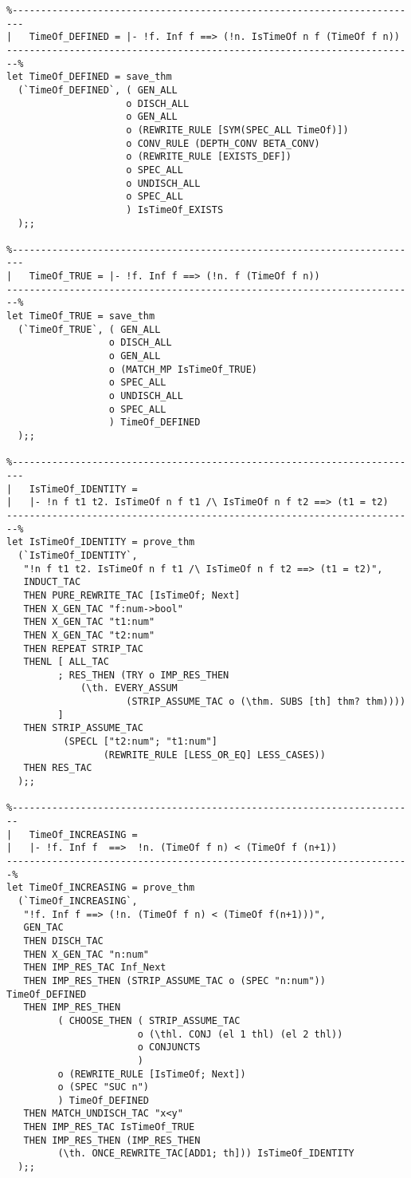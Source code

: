 \begin{verbatim}
%------------------------------------------------------------------------
|   TimeOf_DEFINED = |- !f. Inf f ==> (!n. IsTimeOf n f (TimeOf f n))
------------------------------------------------------------------------%
let TimeOf_DEFINED = save_thm
  (`TimeOf_DEFINED`, ( GEN_ALL
                     o DISCH_ALL
                     o GEN_ALL
                     o (REWRITE_RULE [SYM(SPEC_ALL TimeOf)])
                     o CONV_RULE (DEPTH_CONV BETA_CONV)
                     o (REWRITE_RULE [EXISTS_DEF])
                     o SPEC_ALL
                     o UNDISCH_ALL
                     o SPEC_ALL
                     ) IsTimeOf_EXISTS
  );;

%------------------------------------------------------------------------
|   TimeOf_TRUE = |- !f. Inf f ==> (!n. f (TimeOf f n))
------------------------------------------------------------------------%
let TimeOf_TRUE = save_thm
  (`TimeOf_TRUE`, ( GEN_ALL
                  o DISCH_ALL
                  o GEN_ALL
                  o (MATCH_MP IsTimeOf_TRUE)
                  o SPEC_ALL
                  o UNDISCH_ALL
                  o SPEC_ALL
                  ) TimeOf_DEFINED
  );;

%------------------------------------------------------------------------
|   IsTimeOf_IDENTITY =
|   |- !n f t1 t2. IsTimeOf n f t1 /\ IsTimeOf n f t2 ==> (t1 = t2)
------------------------------------------------------------------------%
let IsTimeOf_IDENTITY = prove_thm
  (`IsTimeOf_IDENTITY`,
   "!n f t1 t2. IsTimeOf n f t1 /\ IsTimeOf n f t2 ==> (t1 = t2)",
   INDUCT_TAC
   THEN PURE_REWRITE_TAC [IsTimeOf; Next]
   THEN X_GEN_TAC "f:num->bool"
   THEN X_GEN_TAC "t1:num"
   THEN X_GEN_TAC "t2:num"
   THEN REPEAT STRIP_TAC
   THENL [ ALL_TAC
         ; RES_THEN (TRY o IMP_RES_THEN
             (\th. EVERY_ASSUM
                     (STRIP_ASSUME_TAC o (\thm. SUBS [th] thm? thm))))
         ]
   THEN STRIP_ASSUME_TAC
          (SPECL ["t2:num"; "t1:num"]
                 (REWRITE_RULE [LESS_OR_EQ] LESS_CASES))
   THEN RES_TAC
  );;

%-----------------------------------------------------------------------
|   TimeOf_INCREASING =
|   |- !f. Inf f  ==>  !n. (TimeOf f n) < (TimeOf f (n+1))
-----------------------------------------------------------------------%
let TimeOf_INCREASING = prove_thm
  (`TimeOf_INCREASING`,
   "!f. Inf f ==> (!n. (TimeOf f n) < (TimeOf f(n+1)))",
   GEN_TAC
   THEN DISCH_TAC
   THEN X_GEN_TAC "n:num"
   THEN IMP_RES_TAC Inf_Next
   THEN IMP_RES_THEN (STRIP_ASSUME_TAC o (SPEC "n:num")) TimeOf_DEFINED
   THEN IMP_RES_THEN
         ( CHOOSE_THEN ( STRIP_ASSUME_TAC
                       o (\thl. CONJ (el 1 thl) (el 2 thl))
                       o CONJUNCTS
                       )
         o (REWRITE_RULE [IsTimeOf; Next])
         o (SPEC "SUC n")
         ) TimeOf_DEFINED
   THEN MATCH_UNDISCH_TAC "x<y"
   THEN IMP_RES_TAC IsTimeOf_TRUE
   THEN IMP_RES_THEN (IMP_RES_THEN
         (\th. ONCE_REWRITE_TAC[ADD1; th])) IsTimeOf_IDENTITY
  );;


\end{verbatim}
